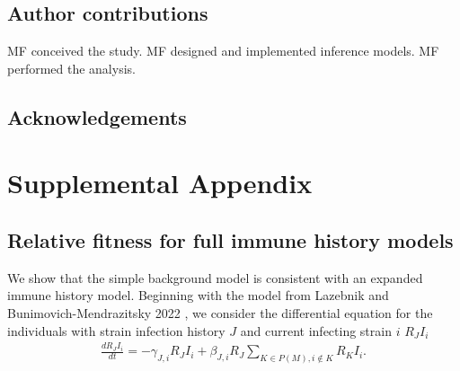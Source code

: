 \documentclass[12pt,oneside,letterpaper]{article}
\begin{document}
\subsection*{Author contributions}
MF conceived the study.
MF designed and implemented inference models.
MF performed the analysis.


\subsection*{Acknowledgements}%




\newpage

\appendix

\setcounter{figure}{0}
\setcounter{table}{0}
\setcounter{page}{1}
\renewcommand{\thefigure}{S\arabic{figure}}
\renewcommand{\thetable}{S\arabic{table}}
\renewcommand{\thepage}{S\arabic{page}}
\renewcommand{\thesubsection}{S\arabic{subsection}}

\section*{Supplemental Appendix}

\subsection{Relative fitness for full immune history models}\label{ssec:full_immune_history}


We show that the simple background model is consistent with an expanded immune history model.
Beginning with the model from Lazebnik and Bunimovich-Mendrazitsky 2022 \cite{Lazebnik2022}, we consider the differential equation for the individuals with strain infection history $J$ and current infecting strain $i$ $R_{J}I_{i}$
\begin{align*}
\frac{dR_{J} I_{i}}{dt} = - \gamma_{J, i} R_{J} I_{i} + \beta_{J, i} R_{J} \sum_{K \in P(M), i\notin K} R_{K}I_{i}.
\end{align*}
\end{document}
